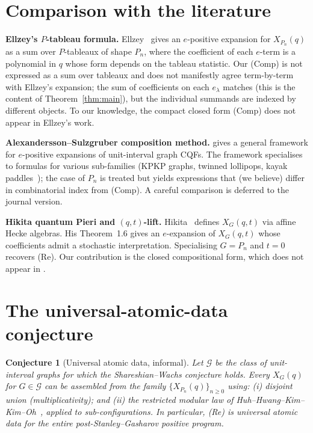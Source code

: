 \documentclass[11pt,a4paper]{amsart}
\newtheorem{conjecture}[theorem]{Conjecture}
\theoremstyle{definition}
\newcommand{\CQF}{X}
\newcommand{\Path}{P}
\begin{document}
\section{Comparison with the literature}\label{sec:comparison}

\textbf{Ellzey's $P$-tableau formula.} Ellzey~\cite{Ellzey2017a} gives
an $e$-positive expansion for $\CQF_{\Path_n}(q)$ as a sum over
$P$-tableaux of shape $\Path_n$, where the coefficient of each $e$-term
is a polynomial in $q$ whose form depends on the tableau statistic.
Our (Comp) is not expressed as a sum over tableaux and does not
manifestly agree term-by-term with Ellzey's expansion; the sum of
coefficients on each $e_\lambda$ matches (this is the content of
Theorem~\ref{thm:main}), but the individual summands are indexed by
different objects. To our knowledge, the compact closed form (Comp)
does not appear in Ellzey's work.

\textbf{Alexandersson--Sulzgruber composition method.}
\cite{AlexanderssonSulzgruber2025} gives a general framework for
$e$-positive expansions of unit-interval graph CQFs. The framework
specialises to formulas for various sub-families (KPKP graphs, twinned
lollipops, kayak paddles~\cite{AlexanderssonEtAl2024}); the case of
$\Path_n$ is treated but yields expressions that (we believe) differ in
combinatorial index from (Comp). A careful comparison is deferred to
the journal version.

\textbf{Hikita quantum Pieri and $(q,t)$-lift.}
Hikita~\cite{Hikita2025} defines $\CQF_G(q,t)$ via affine Hecke
algebras. His Theorem~1.6 gives an $e$-expansion of $\CQF_G(q,t)$ whose
coefficients admit a stochastic interpretation. Specialising $G = \Path_n$
and $t = 0$ recovers (Re). Our contribution is the closed
compositional form, which does not appear in \cite{Hikita2025}.

\section{The universal-atomic-data conjecture}\label{sec:atomic}

\begin{conjecture}[Universal atomic data, informal]
Let $\mathcal{G}$ be the class of unit-interval graphs for which the
Shareshian--Wachs conjecture holds. Every $\CQF_G(q)$ for $G \in
\mathcal{G}$ can be assembled from the family
$\{\CQF_{\Path_n}(q)\}_{n \ge 0}$ using: (i) disjoint union
(multiplicativity); and (ii) the restricted modular law of
Huh--Hwang--Kim--Kim--Oh~\cite{HuhHwangKimKimOh2025}, applied to
sub-configurations. In particular, (Re) is universal atomic data for
the entire post-Stanley--Gasharov positive program.
\end{conjecture}
\end{document}
